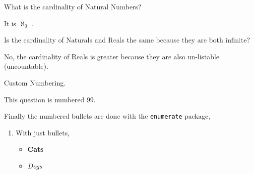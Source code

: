 \documentclass{homework}
\begin{document}
\begin{question}
What is the cardinality of Natural Numbers?

It is \(\aleph_0\) \cite{arlinghaus1996part}.
\end{question}

\begin{question}
Is the cardinality of Naturals and Reals the same because they are both infinite?

No, the cardinality of Reals is greater because they are also un-listable (uncountable).
\end{question}

\begin{question}[99]
Custom Numbering.

This question is numbered 99.
\end{question}

\begin{question}
Finally the numbered bullets are done with the \texttt{enumerate} package,

\begin{enumerate}
\item With just bullets,
\begin{itemize}
\item \textbf{Cats}
\item \emph{Dogs}
\end{itemize}
\end{enumerate}
\end{question}



\end{document}
